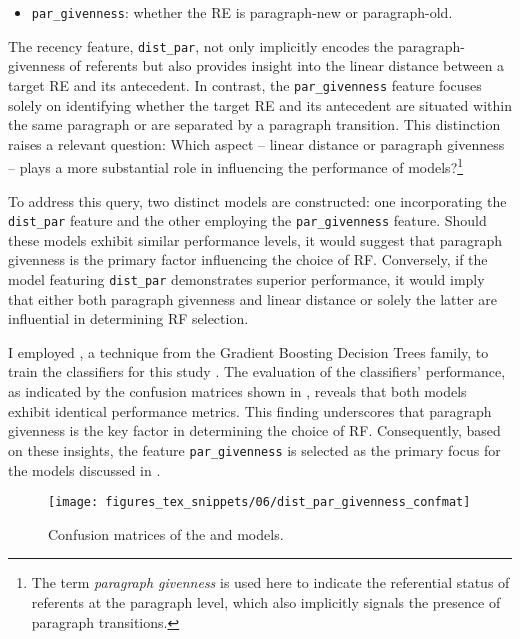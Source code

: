 \begin{itemize}
	\item \texttt{par\_givenness}: whether the RE is paragraph-new or paragraph-old. 
\end{itemize}

The recency feature, \texttt{dist\_par}, not only implicitly encodes the paragraph-givenness of referents but also provides insight into the linear distance between a target RE and its antecedent. In contrast, the \texttt{par\_givenness} feature focuses solely on identifying whether the target RE and its antecedent are situated within the same paragraph or are separated by a paragraph transition. This distinction raises a relevant question: Which aspect -- linear distance or paragraph givenness -- plays a more substantial role in influencing the performance of \context models?\footnote{The term \textit{paragraph givenness} is used here to indicate the referential status of referents at the paragraph level, which also implicitly signals the presence of paragraph transitions.}

To address this query, two distinct models are constructed: one incorporating the \texttt{dist\_par} feature and the other employing the \texttt{par\_givenness} feature. Should these models exhibit similar performance levels, it would suggest that paragraph givenness is the primary factor influencing the choice of RF. Conversely, if the model featuring \texttt{dist\_par} demonstrates superior performance, it would imply that either both paragraph givenness and linear distance or solely the latter are influential in determining RF selection.


I employed , a technique from the Gradient Boosting Decision Trees family, to train the classifiers for this study \citep{xgboost2016}. The evaluation of the classifiers' performance, as indicated by the confusion matrices shown in , reveals that both models exhibit identical performance metrics. This finding underscores that paragraph givenness is the key factor in determining the choice of RF. Consequently, based on these insights, the feature \texttt{par\_givenness} is selected as the primary focus for the models discussed in .

\begin{figure}
	\centering
	\texttt{[image: figures\_tex\_snippets/06/dist\_par\_givenness\_confmat]}
	\caption{Confusion matrices of the  and  models.}
	\label{fig:distpargivennessconfmat}
\end{figure}


